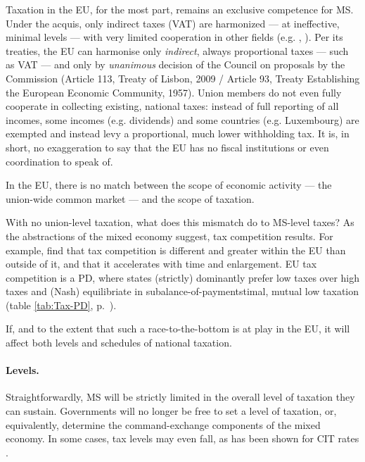 \documentclass[11pt,a4paper,oneside]{article}
\begin{document}

Taxation in the \gls{EU}, for the most part, remains an exclusive competence for \gls{MS}. Under the acquis, only indirect taxes (VAT) are harmonized --- at ineffective, minimal levels --- with very limited cooperation in other fields (e.g. \citealt{EuropeanCommission2009}, \citealt{TaxCoordinationandTaxCompetitionintheEuropeanUnion-EvaluatingtheCodeofConductonBusinessTaxation2001}). 
Per its treaties, the \gls{EU} can harmonise only \emph{indirect}, always proportional taxes --- such as \gls{VAT} --- and only by \emph{unanimous} decision of the Council on proposals by the Commission (Article 113, Treaty of Lisbon, 2009 / Article 93, Treaty Establishing the European Economic Community, 1957). 
Union members do not even fully cooperate in collecting existing, national taxes: 
instead of full reporting of all incomes, some incomes (e.g. dividends) and some countries (e.g. Luxembourg) are exempted and instead levy a proportional, much lower withholding tax. 
It is, in short, no exaggeration to say that the \gls{EU} has no fiscal institutions or even coordination to speak of.

In the \gls{EU}, there is no match between the scope of economic activity --- the union-wide common market --- and the scope of taxation. 

With no union-level taxation, what does this mismatch do to 
\gls{MS}-level taxes? 
As the abstractions of the mixed economy suggest, tax competition results. 
For example, \cite{Genschel2009} find that tax competition is different and greater within the \gls{EU} than outside of it, and that it accelerates with time and enlargement. 
\gls{EU} tax competition is a \gls{PD}, where states (strictly) dominantly prefer low taxes over high taxes and (Nash) equilibriate in subalance-of-paymentstimal, mutual low taxation (table \ref{tab:Tax-PD}, p.~\pageref{tab:Tax-PD}).



If, and to the extent that such a race-to-the-bottom is at play in the \gls{EU}, it will affect both levels and schedules of national taxation.

\paragraph{Levels.} 
Straightforwardly, \gls{MS} will be strictly limited in the overall level of taxation they can sustain. 
Governments will no longer be free to set a level of taxation, or, equivalently, determine the command-exchange components of the mixed economy. 
In some cases, tax levels may even fall, as has been shown for \gls{CIT} rates \citep{Piatkowski2008}.
\end{document}
